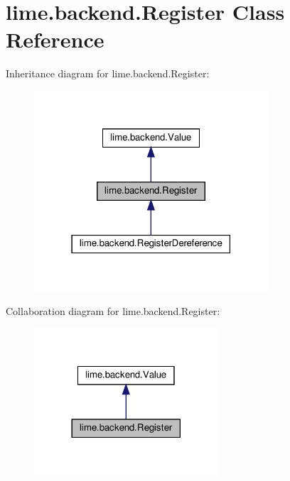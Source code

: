 \hypertarget{classlime_1_1backend_1_1Register}{}\section{lime.\+backend.\+Register Class Reference}
\label{classlime_1_1backend_1_1Register}


Inheritance diagram for lime.\+backend.\+Register\+:
\nopagebreak
\begin{figure}[H]
\begin{center}
\leavevmode
\includegraphics[width=247pt]{classlime_1_1backend_1_1Register__inherit__graph}
\end{center}
\end{figure}


Collaboration diagram for lime.\+backend.\+Register\+:
\nopagebreak
\begin{figure}[H]
\begin{center}
\leavevmode
\includegraphics[width=194pt]{classlime_1_1backend_1_1Register__coll__graph}
\end{center}
\end{figure}
